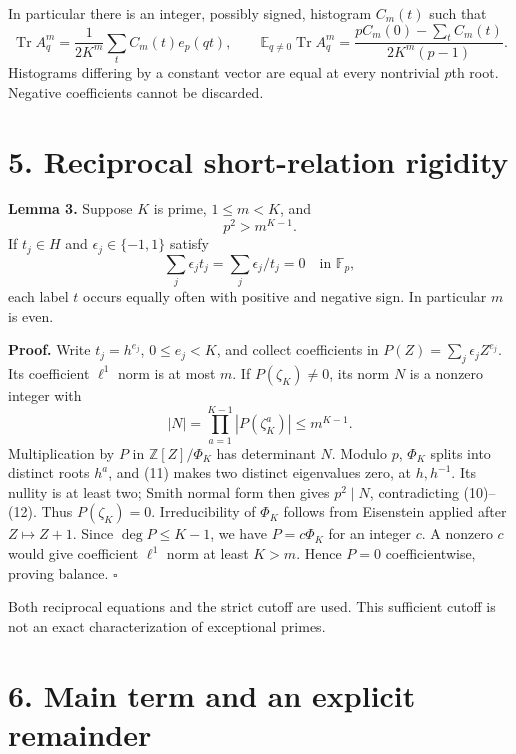 \documentclass[
  11pt,
]{article}
\begin{document}
In particular there is an integer, possibly signed, histogram \(C_m(t)\)
such that \[
 \operatorname{Tr} A_q^m=\frac1{2K^m}\sum_tC_m(t)e_p(qt),\qquad
 \mathbb E_{q\ne0}\operatorname{Tr} A_q^m
 =\frac{pC_m(0)-\sum_tC_m(t)}{2K^m(p-1)}. \tag{9}
\] Histograms differing by a constant vector are equal at every
nontrivial \(p\)th root. Negative coefficients cannot be discarded.

\hypertarget{reciprocal-short-relation-rigidity}{%
\section{5. Reciprocal short-relation
rigidity}\label{reciprocal-short-relation-rigidity}}

\textbf{Lemma 3.} Suppose \(K\) is prime, \(1\leq m<K\), and \[
 p^2>m^{K-1}. \tag{10}
\] If \(t_j\in H\) and \(\epsilon_j\in\{-1,1\}\) satisfy \[
 \sum_j\epsilon_jt_j=\sum_j\epsilon_j/t_j=0\quad\text{in }\mathbb F_p,
 \tag{11}
\] each label \(t\) occurs equally often with positive and negative
sign. In particular \(m\) is even.

\textbf{Proof.} Write \(t_j=h^{e_j}\), \(0\leq e_j<K\), and collect
coefficients in \(P(Z)=\sum_j\epsilon_jZ^{e_j}\). Its coefficient
\(\ell^1\) norm is at most \(m\). If \(P(\zeta_K)\ne0\), its norm \(N\)
is a nonzero integer with \[
 |N|=\prod_{a=1}^{K-1}|P(\zeta_K^a)|\leq m^{K-1}. \tag{12}
\] Multiplication by \(P\) in \(\mathbb Z[Z]/\Phi_K\) has determinant
\(N\). Modulo \(p\), \(\Phi_K\) splits into distinct roots \(h^a\), and
(11) makes two distinct eigenvalues zero, at \(h,h^{-1}\). Its nullity
is at least two; Smith normal form then gives \(p^2\mid N\),
contradicting (10)--(12). Thus \(P(\zeta_K)=0\). Irreducibility of
\(\Phi_K\) follows from Eisenstein applied after \(Z\mapsto Z+1\). Since
\(\deg P\leq K-1\), we have \(P=c\Phi_K\) for an integer \(c\). A
nonzero \(c\) would give coefficient \(\ell^1\) norm at least \(K>m\).
Hence \(P=0\) coefficientwise, proving balance. \(\square\)

Both reciprocal equations and the strict cutoff are used. This
sufficient cutoff is not an exact characterization of exceptional
primes.

\hypertarget{main-term-and-an-explicit-remainder}{%
\section{6. Main term and an explicit
remainder}\label{main-term-and-an-explicit-remainder}}
\end{document}
